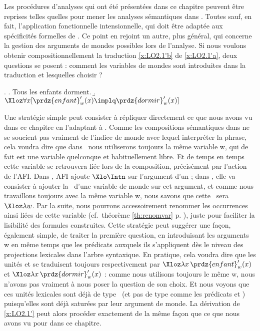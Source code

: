 Les procédures d'analyses qui ont été présentées dans ce chapitre peuvent être reprises telles quelles pour mener les analyses sémantiques dans {\LOz}.  Toutes sauf, en fait, l'application fonctionnelle intensionnelle, qui doit être adaptée aux spécificités formelles de \LOz.  Ce point  en rejoint un autre, plus général, qui concerne la gestion des arguments de mondes possibles lors de l'analyse.
Si nous voulons obtenir compositionnellement la traduction \ref{x:LO2.1'b} de \ref{x:LO2.1'a}, deux questions se posent : comment les variables de mondes sont introduites dans la traduction et   lesquelles choisir ? 

\ex.  \label{x:LO2.1'}
\a. Tous les enfants dorment. \label{x:LO2.1'a}
\b. \(\Xloz\forall x [\prdz{enfant}'_w(x)\implq\prdz{dormir}'_w(x)]\) \label{x:LO2.1'b}



Une  stratégie simple peut consister à répliquer directement ce que nous avons vu dans ce chapitre en l'adaptant à {\LOz}.   Comme les compositions sémantiques dans {\LO} ne se soucient pas vraiment de l'indice de monde avec lequel interpréter la phrase, cela voudra dire que dans \LOz\ nous utiliserons toujours la même variable  \vrbz w, qui de fait est une variable quelconque et habituellement libre.  Et de temps en temps cette variable se retrouvera liée lors de la composition, précisément par l'action de l'AFI.   Dans {\LO}, AFI ajoute $\Xlo\Intn$ sur l'argument d'un {\lterme} ; dans \LOz, elle va consister à ajouter la \labstraction\ d'une variable de monde sur cet argument, et comme nous travaillons toujours avec la même variable \vrbz w, nous savons que cette \labstraction\ sera $\Xloz\lambda w$.  Par la suite, nous pourrons accessoirement renommer les occurrences ainsi liées de cette variable (cf.\ théorème \ref{th:renomvar} p. \pageref{th:renomvar}), juste pour faciliter la lisibilité des formules construites.   
Cette stratégie peut suggérer une façon, également simple, de traiter la première question, en introduisant les arguments \vrbz w en même temps que les prédicats auxquels ils s'appliquent dès le niveau des projections lexicales dans l'arbre syntaxique.  En pratique, cela voudra dire que les unités  et  se traduisent toujours respectivement par $\Xloz\lambda x\,\prdz{enfant}'_w(x)$ et $\Xloz\lambda x\,\prdz{dormir}'_w(x)$ : comme nous utilisons toujours le même \vrbz w, nous n'avons pas vraiment à nous poser la question de son choix.   Et nous voyons que ces unités lexicales sont déjà de type \et\ (et pas de type  comme les prédicats  et ) puisqu'elles sont déjà saturées par leur argument de monde.  La dérivation de  \ref{x:LO2.1'} peut alors procéder exactement de la même façon que ce que nous avons vu pour {\LO} dans ce chapitre.

